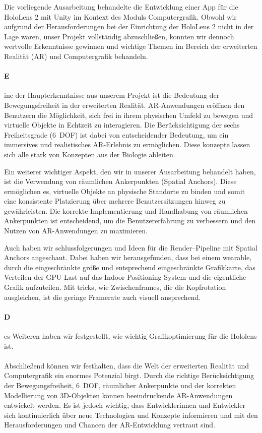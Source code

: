 Die vorliegende Ausarbeitung behandelte die Entwicklung einer App für die HoloLens 2 mit Unity im Kontext des Moduls Computergrafik.
Obwohl wir aufgrund der Herausforderungen bei der Einrichtung der HoloLens 2 nicht in der Lage waren, unser Projekt vollständig abzuschließen, konnten wir dennoch wertvolle Erkenntnisse gewinnen und wichtige Themen im Bereich der erweiterten Realität (AR) und Computergrafik behandeln.

\paragraph{E}ine der Haupterkenntnisse aus unserem Projekt ist die Bedeutung der Bewegungsfreiheit in der erweiterten Realität.
    AR-Anwendungen eröffnen den Benutzern die Möglichkeit, sich frei in ihrem physischen Umfeld zu bewegen und virtuelle Objekte in Echtzeit zu interagieren.
    Die Berücksichtigung der sechs Freiheitsgrade (6~DOF) ist dabei von entscheidender Bedeutung, um ein immersives und realistisches AR-Erlebnis zu ermöglichen.
    Diese konzepte lassen sich alle stark von Konzepten aus der Biologie ableiten.


    Ein weiterer wichtiger Aspekt, den wir in unserer Ausarbeitung behandelt haben, ist die Verwendung von räumlichen Ankerpunkten (Spatial Anchors).
    Diese ermöglichen es, virtuelle Objekte an physische Standorte zu binden und somit eine konsistente Platzierung über mehrere Benutzersitzungen hinweg zu gewährleisten.
    Die korrekte Implementierung und Handhabung von räumlichen Ankerpunkten ist entscheidend, um die Benutzererfahrung zu verbessern und den Nutzen von AR-Anwendungen zu maximieren.

    Auch haben wir schlussfolgerungen und Ideen für die Render--Pipeline mit Spatial Anchors angeschaut.
    Dabei haben wir herausgefunden, dass bei einem wearable, durch die eingeschränkte größe und entsprechend eingeschränkte Grafikkarte, das Verteilen der GPU Last auf das Indoor Positioning System und die eigentliche Grafik aufzuteilen.
    Mit tricks, wie Zwischenframes, die die Kopfrotation ausgleichen, ist die geringe Framerate auch visuell ansprechend.

\paragraph{D}es Weiteren haben wir festgestellt, wie wichtig Grafikoptimierung für die Hololens ist.

\paragraph*{}
    Abschließend können wir festhalten, dass die Welt der erweiterten Realität und Computergrafik ein enormes Potenzial birgt.
    Durch die richtige Berücksichtigung der Bewegungsfreiheit, 6~DOF, räumlicher Ankerpunkte und der korrekten Modellierung von 3D-Objekten können beeindruckende AR-Anwendungen entwickelt werden.
    Es ist jedoch wichtig, dass Entwicklerinnen und Entwickler sich kontinuierlich über neue Technologien und Konzepte informieren und mit den Herausforderungen und Chancen der AR-Entwicklung vertraut sind.
